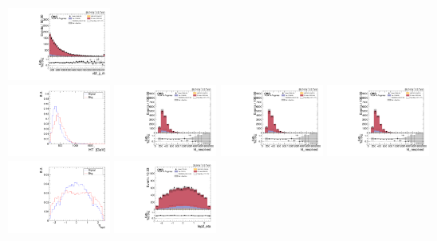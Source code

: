 \begin{figure}[!ht]
  \includegraphics[width=0.24\textwidth]{analysis_plots/2018_zjj/cr_vjets_l/vbf_jj_m.pdf}\\
  \includegraphics[width=0.24\textwidth]{analysis_plots/tmva_plots/zjj_BDTG14_ht_resolved.pdf}
  \includegraphics[width=0.24\textwidth]{analysis_plots/2018_zjj/cr_vjets_l/ht_resolved.pdf}
  \includegraphics[width=0.24\textwidth]{analysis_plots/2018_zjj/cr_vjets_l/ht_resolved.pdf}
  \includegraphics[width=0.24\textwidth]{analysis_plots/2018_zjj/cr_vjets_l/ht_resolved.pdf}\\
  \includegraphics[width=0.24\textwidth]{analysis_plots/tmva_plots/zjj_BDTG14_lep2_eta.pdf}
  \includegraphics[width=0.24\textwidth]{analysis_plots/2016_zjj/cr_vjets_l/lep2_eta.pdf}

\end{figure}
